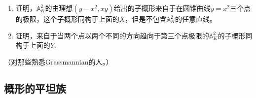 \begin{exe}
	\begin{enumerate}[{(i)}]\setlength{\itemsep}{0pt}
		\item 证明，$\mathbb{A}_K^2$的由理想$(y-x^2,xy)$给出的子概形来自于在圆锥曲线$y=x^2$三个点的极限，这个子概形同构于上面的$X$，但是不包含$\mathbb{A}_K^2$的任意直线。


		\item 证明，来自于当两个点以两个不同的方向趋向于第三个点极限的$\mathbb{A}_K^2$的子概形同构于上面的$Y$.
	\end{enumerate}
\end{exe}

\begin{exe} （对那些熟悉Grassmannian的人。）
\end{exe}





\subsection{概形的平坦族}\label{s.2.3.4}




